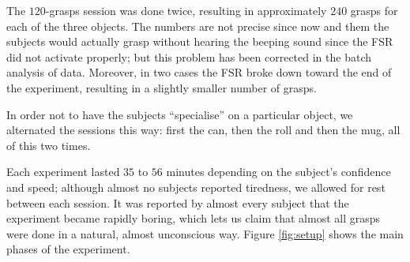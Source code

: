 The $120$-grasps session was done twice, resulting in approximately
$240$ grasps for each of the three objects. The numbers are not
precise since now and them the subjects would actually grasp without
hearing the beeping sound since the FSR did not activate properly; but
this problem has been corrected in the batch analysis of
data. Moreover, in two cases the FSR broke down toward the end of the
experiment, resulting in a slightly smaller number of grasps.

In order not to have the subjects ``specialise'' on a particular
object, we alternated the sessions this way: first the can, then the
roll and then the mug, all of this two times.

Each experiment lasted $35$ to $56$ minutes depending on the subject's
confidence and speed; although almost no subjects reported tiredness,
we allowed for rest between each session. It was reported by almost
every subject that the experiment became rapidly boring, which lets us
claim that almost all grasps were done in a natural, almost
unconscious way. Figure \ref{fig:setup} shows the main phases of the
experiment.

